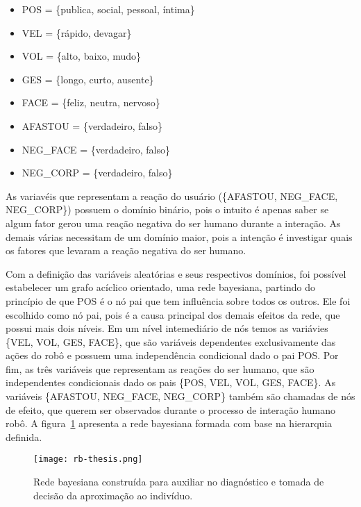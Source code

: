 \begin{itemize}
	\item POS = \{publica, social, pessoal, íntima\}
	\item VEL = \{rápido, devagar\}
	\item VOL = \{alto, baixo, mudo\}
	\item GES = \{longo, curto, ausente\}
	\item FACE = \{feliz, neutra, nervoso\}
	\item AFASTOU = \{verdadeiro, falso\}
	\item NEG\_FACE = \{verdadeiro, falso\}
	\item NEG\_CORP = \{verdadeiro, falso\}
\end{itemize}

As variavéis que representam a reação do usuário (\{AFASTOU, NEG\_FACE, NEG\_CORP\}) possuem o domínio binário, pois o intuito é apenas saber se algum fator gerou uma reação negativa do ser humano durante a interação. As demais várias necessitam de um domínio maior, pois a intenção é investigar quais os fatores que levaram a reação negativa do ser humano.

Com a definição das variáveis aleatórias e seus respectivos domínios, foi possível estabelecer um grafo acíclico orientado, uma rede bayesiana, partindo do princípio de que POS é o nó pai que tem influência sobre todos os outros. Ele foi escolhido como nó pai, pois é a causa principal dos demais efeitos da rede, que possui mais dois níveis. Em um nível intemediário de nós temos as variávies \{VEL, VOL, GES, FACE\}, que são variáveis dependentes exclusivamente das ações do robô e possuem uma independência condicional dado o pai POS. Por fim, as três variáveis que representam as reações do ser humano, que são independentes condicionais dado os pais \{POS, VEL, VOL, GES, FACE\}. As variáveis \{AFASTOU, NEG\_FACE, NEG\_CORP\} também são chamadas de nós de efeito, que querem ser observados durante o processo de interação humano robô. A figura~\ref{fig:rb} apresenta a rede bayesiana formada com base na hierarquia definida.

\begin{figure}[ht!]
	\centering
	\begin{minipage}{0.8\textwidth}
		\caption{Rede bayesiana construída para auxiliar no diagnóstico e tomada de decisão da aproximação ao indivíduo.}
		\texttt{[image: rb-thesis.png]}
		\label{fig:rb}
	\end{minipage}
\end{figure}

